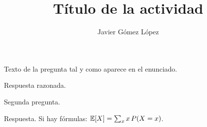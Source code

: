 \documentclass[cabecera,sinindice]{upo-master}
\title{Título de la actividad}
\author{Javier Gómez López}
\begin{document}
\maketitle

\begin{enunciado}
Texto de la pregunta tal y como aparece en el enunciado.
\end{enunciado}
\begin{respuesta}
Respuesta razonada.
\end{respuesta}

\ejercicio
\begin{enunciado}
Segunda pregunta.
\end{enunciado}
\begin{respuesta}
Respuesta. Si hay fórmulas: $\mathbb{E}[X] = \sum_x x\,P(X=x)$.
\end{respuesta}

\declaracionIA

% 
% 
\end{document}
